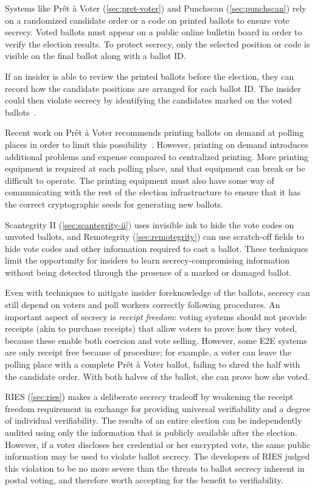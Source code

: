 Systems like Prêt à Voter (\autoref{sec:pret-voter}) and Punchscan
(\autoref{sec:punchscan}) rely on a randomized candidate order or a
code on printed ballots to ensure vote secrecy. Voted ballots must
appear on a public online bulletin board in order to verify the
election results. To protect secrecy, only the selected position or
code is visible on the final ballot along with a ballot ID.

If an insider is able to review the printed ballots before the
election, they can record how the candidate positions are arranged for
each ballot ID. The insider could then violate secrecy by identifying
the candidates marked on the voted ballots~\cite{burton2012}.

Recent work on Prêt à Voter recommends printing ballots on demand at
polling places in order to limit this
possibility~\cite{ryan2009}. However, printing on demand introduces
additional problems and expense compared to centralized printing. More
printing equipment is required at each polling place, and that
equipment can break or be difficult to operate. The printing equipment
must also have some way of communicating with the rest of the election
infrastructure to ensure that it has the correct cryptographic seeds
for generating new ballots.

Scantegrity II (\autoref{sec:scantegrity-ii}) uses invisible ink to
hide the vote codes on unvoted ballots, and Remotegrity
(\autoref{sec:remotegrity}) can use scratch-off fields to hide vote
codes and other information required to cast a ballot. These
techniques limit the opportunity for insiders to learn
secrecy-compromising information without being detected through the
presence of a marked or damaged ballot.

Even with techniques to mitigate insider foreknowledge of the ballots,
secrecy can still depend on voters and poll workers correctly
following procedures. An important aspect of secrecy is \emph{receipt
  freedom}: voting systems should not provide receipts (akin to
purchase receipts) that allow voters to prove how they voted, because
these enable both coercion and vote selling. However, some E2E systems
are only receipt free because of procedure; for example, a voter can
leave the polling place with a complete Prêt à Voter ballot, failing
to shred the half with the candidate order. With both halves of the
ballot, she can prove how she voted.

RIES (\autoref{sec:ries}) makes a deliberate secrecy tradeoff by
weakening the receipt freedom requirement in exchange for providing
universal verifiability and a degree of individual verifiability. The
results of an entire election can be independently audited using only
the information that is publicly available after the
election. However, if a voter discloses her credential or her
encrypted vote, the same public information may be used to violate
ballot secrecy. The developers of RIES judged this violation to be no
more severe than the threats to ballot secrecy inherent in postal
voting, and therefore worth accepting for the benefit to
verifiability.

